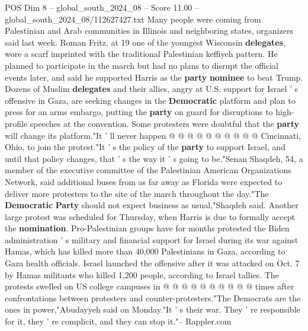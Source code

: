 \begin{textsample}{POS Dim 8 – global\_south\_2024\_08 – Score 11.00 – global\_south\_2024\_08/112627427.txt}
Many people were coming from Palestinian and Arab communities in Illinois and neighboring states, organizers said last week.
Roman Fritz, at 19 one of the youngest Wisconsin \textbf{delegates}, wore a scarf imprinted with the traditional Palestinian keffiyeh pattern.
He planned to participate in the march but had no plans to disrupt the official events later, and said he supported Harris as the \textbf{party} \textbf{nominee} to beat Trump.
Dozens of Muslim \textbf{delegates} and their allies, angry at U.S. support for Israel ' s offensive in Gaza, are seeking changes in the \textbf{Democratic} platform and plan to press for an arms embargo, putting the \textbf{party} on guard for disruptions to high-profile speeches at the convention.
Some protesters were doubtful that the \textbf{party} will change its platform."It ' ll never happen @ @ @ @ @ @ @ @ @ @ Cincinnati, Ohio, to join the protest."It ' s the policy of the \textbf{party} to support Israel, and until that policy changes, that ' s the way it ' s going to be."Senan Shaqdeh, 54, a member of the executive committee of the Palestinian American Organizations Network, said additional buses from as far away as Florida were expected to deliver more protesters to the site of the march throughout the day."The \textbf{Democratic} \textbf{Party} should not expect business as usual,"Shaqdeh said.
Another large protest was scheduled for Thursday, when Harris is due to formally accept the \textbf{nomination}.
Pro-Palestinian groups have for months protested the Biden administration ' s military and financial support for Israel during its war against Hamas, which has killed more than 40,000 Palestinians in Gaza, according to Gaza health officials.
Israel launched the offensive after it was attacked on Oct. 7 by Hamas militants who killed 1,200 people, according to Israel tallies.
The protests swelled on US college campuses in @ @ @ @ @ @ @ @ @ @ times after confrontations between protesters and counter-protesters."The Democrats are the ones in power,"Abudayyeh said on Monday."It ' s their war.
They ' re responsible for it, they ' re complicit, and they can stop it."-- Rappler.com

\end{textsample}
